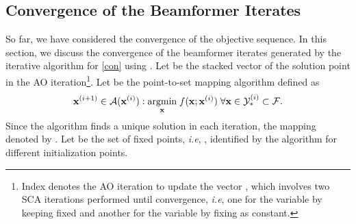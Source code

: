 \subsection{Convergence of the Beamformer Iterates} \label{c-b}
So far, we have considered the convergence of the objective sequence. In this section, we discuss the convergence of the beamformer iterates generated by the iterative algorithm for \eqref{con} using \cite{zangwill1969nonlinear,meyer1976sufficient}. Let  be the stacked vector of the solution point in the  \ac{AO} iteration\footnote{Index  denotes the \ac{AO} iteration to update the vector \me{\ma}, which involves two \ac{SCA} iterations performed until convergence, \textit{i.e}, one for the variable \me{\mx} by keeping \me{\my} fixed and another for the variable \me{\my} by fixing \me{\mx} as constant.}. Let  be the point-to-set mapping algorithm defined as
\begin{equation} \label{algorithm_fixed}
\iterate{\ma}{i+1} \in \mc{A}(\iterate{\ma}{i}) : \underset{\ma}{\mathrm{argmin}} \; f(\ma;\iterate{\ma}{i}) \; \forall \ma \in \iter{\mc{Y}}{\ast}{i} \subset \mc{F}.
\end{equation}
Since the algorithm finds a unique solution in each iteration, the mapping denoted by  . Let  be the set of fixed points, \textit{i.e}, , identified by the algorithm  for different initialization points.

